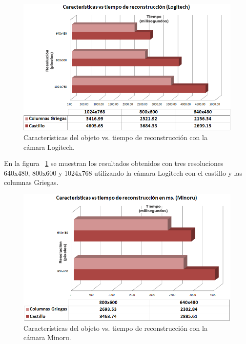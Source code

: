 \begin{figure}[H]
\centering
\includegraphics[width=1.0\textwidth]{images/featime1.png}
\caption[Caracter\'{i}sticas del objeto vs. tiempo de reconstrucci\'{o}n con la c\'{a}mara Logitech]%
{Caracter\'{i}sticas del objeto vs. tiempo de reconstrucci\'{o}n con la c\'{a}mara Logitech.}
\label{fig:FeatureVsTime1}
\end{figure}

En la figura ~\ref{fig:FeatureVsTime1} se muestran los resultados obtenidos con tres resoluciones 640x480, 800x600 y 1024x768 utilizando la c\'{a}mara Logitech con el castillo y las columnas Griegas.

\begin{figure}[H]
\centering
\includegraphics[width=1.0\textwidth]{images/featime2.png}
\caption[Caracter\'{i}sticas del objeto vs. tiempo de reconstrucci\'{o}n con la c\'{a}mara Minoru]%
{Caracter\'{i}sticas del objeto vs. tiempo de reconstrucci\'{o}n con la c\'{a}mara Minoru.}
\label{fig:FeatureVsTime2}
\end{figure}

